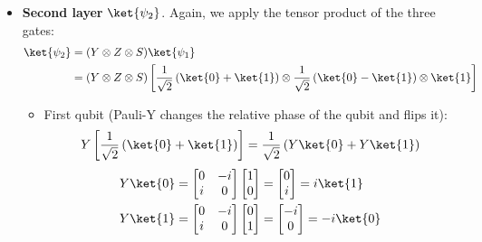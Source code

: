 \begin{itemize}
    \item \textbf{Second layer} $\ket{\psi_2}$. Again, we apply the tensor product of the three gates:
    \begin{equation*}
        \begin{aligned}
            \ket{\psi_2} &= (Y \otimes Z \otimes S) \ket{\psi_1} \\
            &= (Y \otimes Z \otimes S) \left[\frac{1}{\sqrt{2}} \left(\ket{0} + \ket{1}\right) \otimes \frac{1}{\sqrt{2}} \left(\ket{0} - \ket{1}\right) \otimes \ket{1}\right]
        \end{aligned}
    \end{equation*}
    \begin{itemize}
        \item First qubit (Pauli-Y changes the relative phase of the  qubit and flips it):
        \begin{equation*}
            Y \left[\frac{1}{\sqrt{2}} \left(\ket{0} + \ket{1}\right)\right] = \frac{1}{\sqrt{2}} \left(Y\ket{0} + Y\ket{1}\right)
        \end{equation*}
        \begin{align*}
            Y\ket{0} &= \begin{bmatrix}
                0 & -i \\
                i & 0
            \end{bmatrix} \begin{bmatrix}
                1 \\
                0
            \end{bmatrix} = \begin{bmatrix}
                0 \\
                i
            \end{bmatrix} = i \ket{1} \\
            Y\ket{1} &= \begin{bmatrix}
                0 & -i \\
                i & 0
            \end{bmatrix} \begin{bmatrix}
                0 \\
                1
            \end{bmatrix} = \begin{bmatrix}
                -i \\
                0
            \end{bmatrix} = -i \ket{0}
        \end{align*}

\end{itemize}
\end{itemize}
